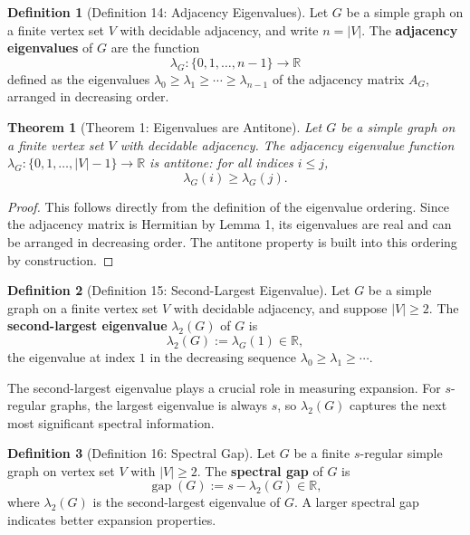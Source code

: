 \documentclass[11pt]{article}
\theoremstyle{plain}
\newtheorem*{theorem}{Theorem}
\theoremstyle{definition}
\newtheorem*{definition}{Definition}
\theoremstyle{remark}
\begin{document}
\begin{definition}[Definition 14: Adjacency Eigenvalues]
Let $G$ be a simple graph on a finite vertex set $V$ with decidable adjacency, and write $n = |V|$. The \textbf{adjacency eigenvalues} of $G$ are the function
\[
\lambda_G : \{0, 1, \ldots, n-1\} \to \mathbb{R}
\]
defined as the eigenvalues $\lambda_0 \geq \lambda_1 \geq \cdots \geq \lambda_{n-1}$ of the adjacency matrix $A_G$, arranged in decreasing order.
\end{definition}

\begin{theorem}[Theorem 1: Eigenvalues are Antitone]
Let $G$ be a simple graph on a finite vertex set $V$ with decidable adjacency. The adjacency eigenvalue function $\lambda_G : \{0, 1, \ldots, |V|-1\} \to \mathbb{R}$ is antitone: for all indices $i \leq j$,
\[
\lambda_G(i) \geq \lambda_G(j).
\]
\end{theorem}

\begin{proof}
This follows directly from the definition of the eigenvalue ordering. Since the adjacency matrix is Hermitian by Lemma 1, its eigenvalues are real and can be arranged in decreasing order. The antitone property is built into this ordering by construction.
\end{proof}

\begin{definition}[Definition 15: Second-Largest Eigenvalue]
Let $G$ be a simple graph on a finite vertex set $V$ with decidable adjacency, and suppose $|V| \geq 2$. The \textbf{second-largest eigenvalue} $\lambda_2(G)$ of $G$ is
\[
\lambda_2(G) := \lambda_G(1) \in \mathbb{R},
\]
the eigenvalue at index $1$ in the decreasing sequence $\lambda_0 \geq \lambda_1 \geq \cdots$.
\end{definition}

The second-largest eigenvalue plays a crucial role in measuring expansion. For $s$-regular graphs, the largest eigenvalue is always $s$, so $\lambda_2(G)$ captures the next most significant spectral information.

\begin{definition}[Definition 16: Spectral Gap]
Let $G$ be a finite $s$-regular simple graph on vertex set $V$ with $|V| \geq 2$. The \textbf{spectral gap} of $G$ is
\[
\operatorname{gap}(G) := s - \lambda_2(G) \in \mathbb{R},
\]
where $\lambda_2(G)$ is the second-largest eigenvalue of $G$. A larger spectral gap indicates better expansion properties.
\end{definition}
\end{document}
